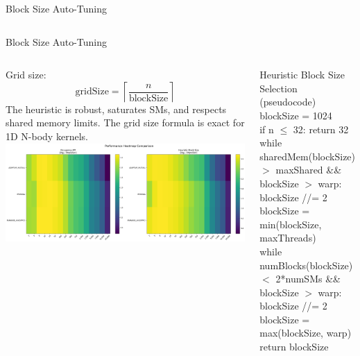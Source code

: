\documentclass{beamer}
\begin{document}
\begin{frame}{Block Size Auto-Tuning}
\begin{columns}[c]
    \end{columns}
\end{frame}

\begin{frame}{Block Size Auto-Tuning}
    \begin{columns}[c]
            {\footnotesize
            Grid size:
            \[
                \text{gridSize} = \left\lceil \frac{n}{\text{blockSize}} \right\rceil
            \]  
            The heuristic is robust, saturates SMs, and respects shared memory limits.  
            The grid size formula is exact for 1D N-body kernels.
            }
            \vspace{0.5cm}
            \includegraphics[width=\linewidth]{figures/gpu_heatmap_blocksize.png}
            \scriptsize
            \small\begin{block}{Heuristic Block Size Selection (pseudocode)}
            {\ttfamily\footnotesize
            blockSize = 1024 \\
            if n $\leq$ 32: return 32 \\
            while sharedMem(blockSize) $>$ maxShared \&\& blockSize $>$ warp: \\
            \hspace{1em} blockSize //= 2 \\
            blockSize = min(blockSize, maxThreads) \\
            while numBlocks(blockSize) $<$ 2*numSMs \&\& blockSize $>$ warp: \\
            \hspace{1em} blockSize //= 2 \\
            blockSize = max(blockSize, warp) \\
            return blockSize
            }
            \end{block}
    \end{columns}
\end{frame}
\end{document}
